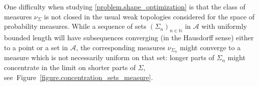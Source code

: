 \documentclass[10pt]{amsart}
\theoremstyle{definition}
\begin{document}
One difficulty when studying \eqref{problem.shape_optimization} is that the class of measures $\nu_\Sigma$ is not closed in the usual weak topologies considered for the space of probability measures.
While a sequence of sets $(\Sigma_{n})_{n\in \mathbb{N}}$ in $\mathcal{A}$ with uniformly bounded length will have subsequences converging (in the Hausdorff sense) either to a point or a set in $\mathcal{A}$, the corresponding measures $\nu_{\Sigma_n}$ might converge to a measure which is not necessarily uniform on that set: longer parts of $\Sigma_n$ might concentrate in the limit on shorter parts of $\Sigma$, see~Figure~\ref{figure.concentration_sets_measure}.
\begin{figure}[t]
\centering

\end{figure}
\end{document}
